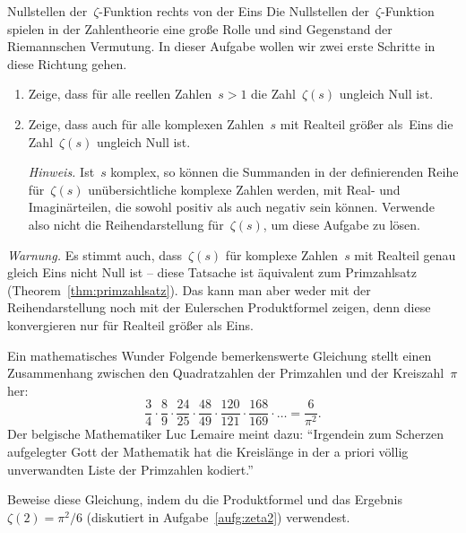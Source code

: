 \documentclass[twoside]{../zirkelblatt1415}
\theoremstyle{definition}
\theoremstyle{plain}
\theoremstyle{remark}
\begin{document}
\begin{aufgabe}{Nullstellen der~$\zeta$-Funktion rechts von der Eins}
Die Nullstellen der~$\zeta$-Funktion spielen in der Zahlentheorie eine große
Rolle und sind Gegenstand der Riemannschen Vermutung. In dieser Aufgabe wollen
wir zwei erste Schritte in diese Richtung gehen.
\begin{enumerate}
\item Zeige, dass für alle reellen Zahlen~$s > 1$ die Zahl~$\zeta(s)$ ungleich
Null ist.
\item Zeige, dass auch für alle komplexen Zahlen~$s$ mit Realteil größer
als~Eins die Zahl~$\zeta(s)$ ungleich Null ist.

\emph{Hinweis.} Ist~$s$ komplex, so können die Summanden in der definierenden
Reihe für~$\zeta(s)$ unübersichtliche komplexe Zahlen werden, mit Real- und
Imaginärteilen, die sowohl positiv als auch negativ sein können. Verwende also
nicht die Reihendarstellung für~$\zeta(s)$, um diese Aufgabe zu lösen.
\end{enumerate}

\emph{Warnung.} Es stimmt auch, dass~$\zeta(s)$ für komplexe Zahlen~$s$ mit
Realteil genau gleich Eins nicht Null ist -- diese Tatsache ist äquivalent zum
Primzahlsatz (Theorem~\ref{thm:primzahlsatz}). Das kann man aber weder mit der
Reihendarstellung noch mit der Eulerschen Produktformel zeigen, denn diese
konvergieren nur für Realteil größer als Eins.
\end{aufgabe}

\begin{aufgabe}{Ein mathematisches Wunder}
Folgende bemerkenswerte Gleichung stellt einen Zusammenhang zwischen den
Quadratzahlen der Primzahlen und der Kreiszahl~$\pi$ her:
\[ \frac{3}{4} \cdot \frac{8}{9} \cdot \frac{24}{25} \cdot \frac{48}{49} \cdot
\frac{120}{121} \cdot \frac{168}{169} \cdot \ldots = \frac{6}{\pi^2}. \]
Der belgische Mathematiker Luc Lemaire meint dazu: "`Irgendein zum Scherzen
aufgelegter Gott der Mathematik hat die Kreislänge in der a priori völlig
unverwandten Liste der Primzahlen kodiert."'\footnotemark

Beweise diese Gleichung, indem du die Produktformel und das Ergebnis~$\zeta(2) =
\pi^2/6$ (diskutiert in Aufgabe~\ref{aufg:zeta2}) verwendest.
\end{aufgabe}
\end{document}

